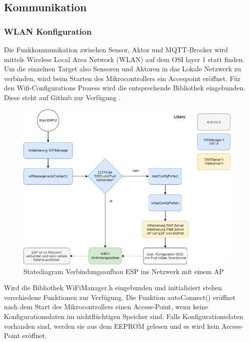 \newpage
\subsection{Kommunikation}\label{subsec: Kommunikation} 
\subsubsection{WLAN Konfiguration}\label{subsub: Wlan Konfiguration}
Die Funkkommunikation zwischen Sensor, Aktor und MQTT-Brocker wird mittels Wireless Local Area Network (WLAN) auf dem OSI layer 1 statt finden. Um die einzelnen Target also Sensoren und Aktoren in das Lokale Netzwerk zu verbinden, wird beim Starten des Mikrocontrollers ein Accespoint eröffnet. Für den Wifi-Configurations Prozess wird die entsprechende Bibliothek eingebunden. Diese steht auf Github zur Verfügung \cite{zhouhan0126_zhouhan0126/wifimanager-esp32_2019}. 

\begin{figure}[H]
	\centering
	\includegraphics[width=\textwidth]{graphics/statediagramWiFi.png}
	\caption{Statediagram Verbindungsaufbau ESP ins Netzwerk mit einem AP}
	\label{pic: statediagramWiFi}
\end{figure}   

Wird die Bibliothek WiFiManager.h eingebunden und initialisiert stehen verschiedene Funktionen zur Verfügung. Die Funktion autoConnect() eröffnet nach dem Start des Mikrocontrollers einen Access-Point, wenn keine Konfigurationsdaten im nichtflüchtigen Speicher sind. Falls Konfigurationsdaten vorhanden sind, werden sie aus dem EEPROM gelesen und es wird kein Access-Point eröffnet.   

